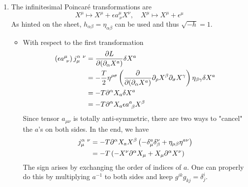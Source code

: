 \begin{enumerate}[label=(\alph*)]
	\item The infinitesimal Poincaré transformations are
		\begin{equation*}
			X^\mu \mapsto X^\mu + \epsilon a^{\mu}_{\ \nu} X^\nu, \quad X^\mu \mapsto X^\mu + \epsilon^\mu
		\end{equation*}
		As hinted on the sheet, $h_{\alpha \beta} = \eta_{\alpha\beta}$ can be used and thus $\sqrt{-h} = 1$.
		\begin{itemize}
			\item With respect to the first transformation
				\begin{align*}
					\left( \epsilon a^{\mu}_{\ \nu} \right) j^{\alpha \ \nu}_{\mu} &= \pdv{L}{(\partial_\alpha X^a)} \delta X^a \\
																										&= - \frac{T}{2} \eta^{\rho \sigma} \left( \pdv{(\partial_\alpha X^a)} \partial_\rho X^\beta \partial_\sigma X^\gamma \right) \eta_{\beta\gamma} \delta X^a \\
																										&= - T \partial^\alpha X_a \delta X^a  \\
																										&= -T \partial^\alpha X_a \epsilon a^{a}_{\ \beta} X^\beta
				\end{align*}
				Since tensor $a_{\mu\nu}$ is totally anti-symmetric, there are two ways to "cancel" the $a$'s on both sides. In the end, we have
				\begin{align}
					j^{\alpha \ \nu}_{\mu} &= - T \partial^\alpha X_a X^\beta \left( - \delta^{a}_\mu \delta_{\beta}^\nu + \eta_{\mu \beta} \eta^{a\nu} \right) \notag \\
												  &= -T \left( - X^\nu \partial^\alpha X_\mu + X_\mu \partial^\alpha X^\nu \right)
				\end{align}
				The sign arises by exchanging the order of indices of $a$. One can properly do this by multiplying $a^{-1}$ to both sides and keep $g^{ik}g_{kj} = \delta^{i}_j$.


\end{itemize}
\end{enumerate}
